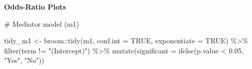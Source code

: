 \documentclass[
  letterpaper,
  DIV=11,
  numbers=noendperiod]{scrartcl}
\newenvironment{Shaded}{\begin{snugshade}}{\end{snugshade}}
\newcommand{\AttributeTok}[1]{\textcolor[rgb]{0.40,0.45,0.13}{#1}}
\newcommand{\CommentTok}[1]{\textcolor[rgb]{0.37,0.37,0.37}{#1}}
\newcommand{\ConstantTok}[1]{\textcolor[rgb]{0.56,0.35,0.01}{#1}}
\newcommand{\FloatTok}[1]{\textcolor[rgb]{0.68,0.00,0.00}{#1}}
\newcommand{\FunctionTok}[1]{\textcolor[rgb]{0.28,0.35,0.67}{#1}}
\newcommand{\NormalTok}[1]{\textcolor[rgb]{0.00,0.23,0.31}{#1}}
\newcommand{\OtherTok}[1]{\textcolor[rgb]{0.00,0.23,0.31}{#1}}
\newcommand{\SpecialCharTok}[1]{\textcolor[rgb]{0.37,0.37,0.37}{#1}}
\newcommand{\StringTok}[1]{\textcolor[rgb]{0.13,0.47,0.30}{#1}}
\begin{document}
\textbf{Odds-Ratio Plots}

\begin{Shaded}
\begin{Highlighting}[]
\CommentTok{\# Mediator model (m1)}

\NormalTok{tidy\_m1 }\OtherTok{\textless{}{-}}\NormalTok{ broom}\SpecialCharTok{::}\FunctionTok{tidy}\NormalTok{(m1, }\AttributeTok{conf.int =} \ConstantTok{TRUE}\NormalTok{, }\AttributeTok{exponentiate =} \ConstantTok{TRUE}\NormalTok{) }\SpecialCharTok{\%\textgreater{}\%}
\FunctionTok{filter}\NormalTok{(term }\SpecialCharTok{!=} \StringTok{"(Intercept)"}\NormalTok{) }\SpecialCharTok{\%\textgreater{}\%}
\FunctionTok{mutate}\NormalTok{(}\AttributeTok{significant =} \FunctionTok{ifelse}\NormalTok{(p.value }\SpecialCharTok{\textless{}} \FloatTok{0.05}\NormalTok{, }\StringTok{"Yes"}\NormalTok{, }\StringTok{"No"}\NormalTok{))}
\end{Highlighting}
\end{Shaded}
\end{document}
